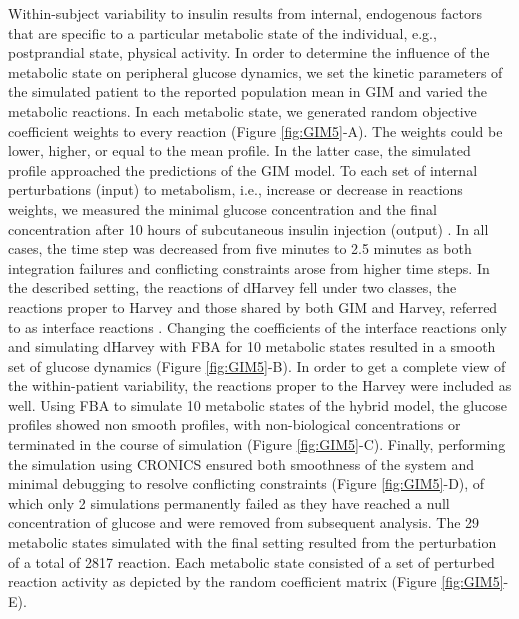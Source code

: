 Within-subject variability to insulin results from internal, endogenous factors that are specific to a particular metabolic state of the individual, e.g., postprandial state, physical activity. In order to determine the influence of the metabolic state on peripheral glucose dynamics, we set the kinetic parameters of the simulated patient to the reported population mean in GIM and varied the metabolic reactions. In each metabolic state, we generated random objective coefficient weights to every reaction (Figure \ref{fig:GIM5}-A). The weights could be lower, higher, or equal to the mean profile. In the latter case, the simulated profile approached the predictions of the GIM model. To each set of internal perturbations (input) to metabolism, i.e., increase or decrease in reactions weights, we measured the minimal glucose concentration and the final concentration after 10 hours of subcutaneous insulin injection (output) \cite{sarkar2010regression}. In all cases, the time step was decreased from five minutes to 2.5 minutes as both integration failures and conflicting constraints arose from higher time steps.  In the described setting, the reactions of dHarvey fell under two classes, the reactions proper to Harvey and those shared by both GIM and Harvey, referred to as interface reactions \cite{wadehn2016multiscale}. Changing the coefficients of the interface reactions only and simulating dHarvey with FBA for 10 metabolic states resulted in a smooth set of glucose dynamics (Figure \ref{fig:GIM5}-B). In order to get a complete view of the within-patient variability, the reactions proper to the Harvey were included as well. Using FBA to simulate 10 metabolic states of the hybrid model, the glucose profiles showed non smooth profiles, with non-biological concentrations or terminated in the course of simulation (Figure \ref{fig:GIM5}-C).  Finally, performing the simulation using CRONICS ensured both smoothness of the system and minimal debugging to resolve conflicting constraints (Figure \ref{fig:GIM5}-D), of which only 2 simulations permanently failed as they have reached a null concentration of glucose and were removed from subsequent analysis. The 29 metabolic states simulated with the final setting resulted from the perturbation of a total of 2817 reaction. Each metabolic state consisted of a set of perturbed reaction activity as depicted by the random coefficient matrix (Figure \ref{fig:GIM5}-E).
